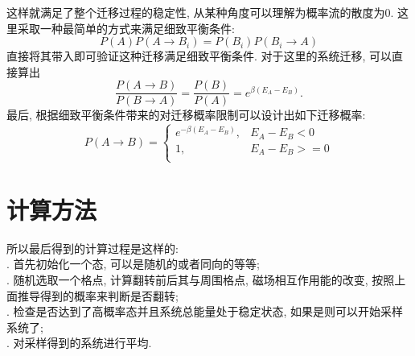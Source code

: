 \documentclass[UTF8]{ctexart}
\begin{document}
            这样就满足了整个迁移过程的稳定性, 从某种角度可以理解为概率流的散度为0. 这里采取一种最简单的方式来满足细致平衡条件:
            \begin{equation}
                P(A)P(A\rightarrow B_i)=P(B_i)P(B_i\rightarrow A)
            \end{equation}
            直接将其带入即可验证这种迁移满足细致平衡条件. 对于这里的系统迁移, 可以直接算出
            \begin{equation}
                \dfrac{P(A\rightarrow B)}{P(B\rightarrow A)}=\dfrac{P(B)}{P(A)}=e^{\beta(E_A-E_B)}.
            \end{equation}
            \indent 最后, 根据细致平衡条件带来的对迁移概率限制可以设计出如下迁移概率:
            \begin{equation}
                P(A\rightarrow B)=
                \left\{
                    \begin{array}{ll}
                        e^{-\beta(E_A-E_B)}, &E_A-E_B<0\\
                        1, &E_A-E_B>=0\\
                    \end{array}
                \right.
            \end{equation}
    \section{计算方法}
        \indent 所以最后得到的计算过程是这样的:\\
        \indent{}. 首先初始化一个态, 可以是随机的或者同向的等等;\\
        \indent{}. 随机选取一个格点, 计算翻转前后其与周围格点, 磁场相互作用能的改变, 按照上面推导得到的概率来判断是否翻转;\\
        \indent{}. 检查是否达到了高概率态并且系统总能量处于稳定状态, 如果是则可以开始采样系统了;\\
        \indent{}. 对采样得到的系统进行平均.\\
\end{document}
